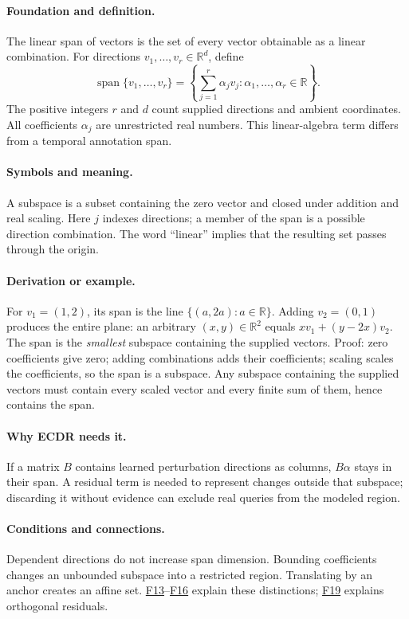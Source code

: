 \documentclass[11pt,a4paper]{article}
\newcommand{\R}{\mathbb R}
\begin{document}
\paragraph{Foundation and definition.}
The linear span of vectors is the set of every vector obtainable as a
linear combination. For directions $v_1,\ldots,v_r\in\R^d$, define
\[
 \operatorname{span}\{v_1,\ldots,v_r\}
 =\left\{\sum_{j=1}^{r}\alpha_jv_j:
                   \alpha_1,\ldots,\alpha_r\in\R\right\}.
\]
The positive integers $r$ and $d$ count supplied directions and ambient
coordinates. All coefficients $\alpha_j$ are unrestricted real numbers.
This linear-algebra term differs from a temporal annotation span.
\paragraph{Symbols and meaning.}
A subspace is a subset containing the zero vector and closed under
addition and real scaling. Here $j$ indexes directions; a member of the
span is a possible direction combination. The word ``linear'' implies
that the resulting set passes through the origin.
\paragraph{Derivation or example.}
For $v_1=(1,2)$, its span is the line
$\{(a,2a):a\in\R\}$. Adding $v_2=(0,1)$ produces the entire plane:
an arbitrary $(x,y)\in\R^2$ equals $xv_1+(y-2x)v_2$.
The span is the \emph{smallest} subspace containing the supplied vectors.
Proof: zero coefficients give zero; adding combinations adds their
coefficients; scaling scales the coefficients, so the span is a subspace.
Any subspace containing the supplied vectors must contain every scaled
vector and every finite sum of them, hence contains the span.
\paragraph{Why ECDR needs it.}
If a matrix $B$ contains learned perturbation directions as columns,
$B\alpha$ stays in their span. A residual term is needed to represent
changes outside that subspace; discarding it without evidence can exclude
real queries from the modeled region.
\paragraph{Conditions and connections.}
Dependent directions do not increase span dimension. Bounding
coefficients changes an unbounded subspace into a restricted region.
Translating by an anchor creates an affine set. \hyperref[concept:F13]{F13}--\hyperref[concept:F16]{F16} explain these
distinctions; \hyperref[concept:F19]{F19} explains orthogonal residuals.
\par\label{endconcept:F12}
\end{document}
